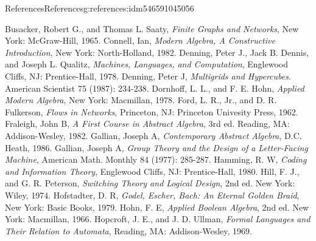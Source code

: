 \documentclass[oneside,10pt,]{book}
\numberwithin{equation}{section}
\begin{document}
\begin{references-chapter-numberless}{References}{}{References}{}{}{g:references:idm546591045056}
\begin{referencelist}
\hypertarget{x:biblio:busacker-1965}{}Busacker, Robert G., and Thomas L. Saaty, \textit{Finite Graphs and Networks}, New York: McGraw-Hill, 1965.
\hypertarget{x:biblio:biblio-connell-1982}{}Connell, Ian, \textit{Modern Algebra, A Constructive Introduction}, New York: North-Holland, 1982.
\hypertarget{x:biblio:biblio-denning-1978}{}Denning, Peter J., Jack B. Dennis, and Joseph L. Qualitz, \textit{Machines, Languages, and Computation}, Englewood Cliffs, NJ: Prentice-Hall, 1978.
\hypertarget{x:biblio:biblio-denning-1987}{}Denning, Peter J, \textit{Multigrids and Hypercubes}. American Scientist 75 (1987): 234-238.
\hypertarget{x:biblio:biblio-dornhoff-1978}{}Dornhoff, L. L., and F. E. Hohn, \textit{Applied Modern Algebra}, New York: Macmillan, 1978.
\hypertarget{x:biblio:biblio-ford-1962}{}Ford, L. R., Jr., and D. R. Fulkerson, \textit{Flows in Networks},  Princeton, NJ: Princeton Univesity Press, 1962.
\hypertarget{x:biblio:biblio-fraleigh-1982}{}Fraleigh, John B, \textit{A First Course in Abstract Algebra}, 3rd ed. Reading, MA: Addison-Wesley, 1982.
\hypertarget{x:biblio:biblio-gallian-1986}{}Gallian, Joseph A, \textit{Contemporary Abstract Algebra}, D.C. Heath, 1986.
\hypertarget{x:biblio:biblio-gallian-1977}{}Gallian, Joseph A, \textit{Group Theory and the Design of a Letter-Facing Machine}, American Math. Monthly 84 (1977): 285-287.
\hypertarget{x:biblio:biblio-hamming-1980}{}Hamming, R. W, \textit{Coding and Information Theory}, Englewood Cliffs, NJ: Prentice-Hall, 1980.
\hypertarget{x:biblio:biblio-hill-1974}{}Hill, F. J., and G. R. Peterson, \textit{Switching Theory and Logical Design}, 2nd ed. New York: Wiley, 1974.
\hypertarget{x:biblio:biblio-hofstadter-1979}{}Hofstadter, D. R, \textit{Godel, Escher, Bach: An Eternal Golden Braid}, New York: Basic Books, 1979.
\hypertarget{x:biblio:biblio-hohn-1966}{}Hohn, F. E, \textit{Applied Boolean Algebra}, 2nd ed. New York: Macmillan, 1966.
\hypertarget{x:biblio:biblio-hopcroft-1969}{}Hopcroft, J. E., and J. D. Ullman,  \textit{Formal Languages and Their Relation to Automata}, Reading, MA: Addison-Wesley, 1969.

\end{referencelist}
\end{references-chapter-numberless}
\end{document}
